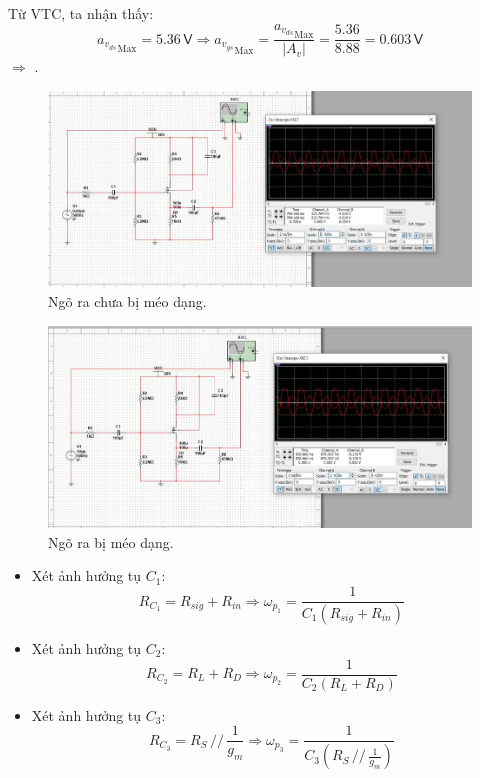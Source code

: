 
Từ VTC, ta nhận thấy:
\[
{a_{v_{ds}}}_{\text{Max}}=5.36\,\textsf{V}
\Rightarrow {a_{v_{gs}}}_{\text{Max}}=\frac{{a_{v_{ds}}}_{\text{Max}}}{\left|A_{v}\right|}=\frac{5.36}{8.88}=0.603\,\textsf{V}
\]
$\Rightarrow$ .

\begin{figure}[H]
	\centering
	\includegraphics[width=\linewidth]{./my-chapters/my-images/Question1/c_3.jpg}
	\caption{Ngõ ra chưa bị méo dạng.}
\end{figure}
\begin{figure}[H]
	\centering
	\includegraphics[width=\linewidth]{./my-chapters/my-images/Question1/c_4.jpg}
	\caption{Ngõ ra bị méo dạng.}
\end{figure}


\begin{itemize}[label=-]
	\item Xét ảnh hưởng tụ $C_{1}$: 
	\[
	R_{C_{1}}=R_{sig}+R_{in}
	\Longrightarrow \omega_{p_{1}}=\frac{1}{C_{1}\left(R_{sig}+R_{in}\right)}
	\]
	
	\item Xét ảnh hưởng tụ $C_{2}$: 
	\[
	R_{C_{2}}=R_{L}+R_{D}
	\Longrightarrow \omega_{p_{2}}=\frac{1}{C_{2}\left(R_{L}+R_{D}\right)}
	\]
	
	\item Xét ảnh hưởng tụ $C_{3}$: 
	\[
	R_{C_{3}}=R_{S}\,//\,\frac{1}{g_{m}}
	\Longrightarrow \omega_{p_{3}}=\frac{1}{C_{3}\left(R_{S}\,//\,\frac{1}{g_{m}}\right)}
	\]
\end{itemize}

